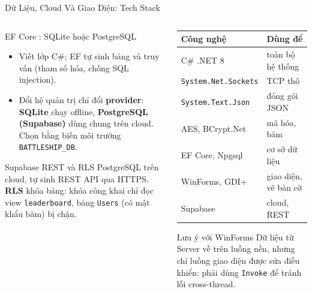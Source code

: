 \begin{frame}[label=tech]{Dữ Liệu, Cloud Và Giao Diện: Tech Stack}
  \begin{columns}[T]
    \begin{column}{0.5\textwidth}
      \begin{block}{EF Core \cite{ref6}: SQLite hoặc PostgreSQL}
        \begin{itemize}\setlength{\itemsep}{0pt}
          \item Viết lớp C\#; EF tự sinh bảng và truy vấn (tham số hóa, chống SQL injection).
          \item Đổi hệ quản trị chỉ đổi \textbf{provider}: \textbf{SQLite} chạy offline, \textbf{PostgreSQL (Supabase)} dùng chung trên cloud. Chọn bằng biến môi trường \texttt{BATTLESHIP\_DB}.
        \end{itemize}
      \end{block}
      \begin{block}{Supabase REST \cite{ref8} và RLS \cite{ref7}}
        PostgreSQL trên cloud, tự sinh REST API qua HTTPS. \textbf{RLS} khóa bảng: khóa công khai chỉ đọc view \texttt{leaderboard}, bảng \texttt{Users} (có mật khẩu băm) bị chặn.
      \end{block}
    \end{column}
    \begin{column}{0.46\textwidth}
      \scriptsize
      \begin{tabularx}{\textwidth}{@{}lY@{}}
        \toprule \textbf{Công nghệ} & \textbf{Dùng để} \\ \midrule
        C\# .NET 8 & toàn bộ hệ thống \\
        \texttt{System.Net.Sockets} \cite{ref5} & TCP thô \\
        \texttt{System.Text.Json} & đóng gói JSON \\
        AES, BCrypt.Net & mã hóa, băm \\
        EF Core, Npgsql & cơ sở dữ liệu \\
        WinForms, GDI+ & giao diện, vẽ bàn cờ \\
        Supabase & cloud, REST \\
        \bottomrule
      \end{tabularx}
      \begin{alertblock}{Lưu ý với WinForms}
        \scriptsize Dữ liệu từ Server về trên luồng nền, nhưng chỉ luồng giao diện được sửa điều khiển: phải dùng \texttt{Invoke} để tránh lỗi cross-thread.
      \end{alertblock}
    \end{column}
  \end{columns}
\end{frame}
